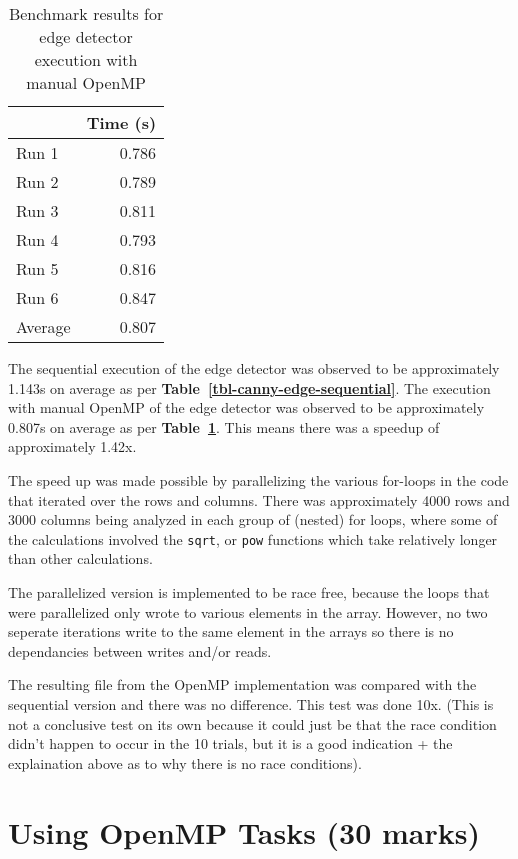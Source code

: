 \documentclass[12pt]{article}
\begin{document}
\begin{table}[H]
  \centering
  \begin{tabular}{lr}
    & {\bf Time (s)} \\
    \hline
    Run 1 & 0.786 \\
    Run 2 & 0.789 \\
    Run 3 & 0.811 \\
    Run 4 & 0.793 \\
    Run 5 & 0.816 \\
    Run 6 & 0.847 \\
    \hline
    Average & 0.807 \\
  \end{tabular}
  \caption{Benchmark results for edge detector execution with manual OpenMP}
  \label{tbl-canny-edge-openmp}
\end{table}

The sequential execution of the edge detector was observed to be approximately 1.143s on average as per {\bf Table~\ref{tbl-canny-edge-sequential}}. The execution with manual OpenMP of the edge detector was observed to be approximately 0.807s on average as per {\bf Table~\ref{tbl-canny-edge-openmp}}. This means there was a speedup of approximately 1.42x.

The speed up was made possible by parallelizing the various for-loops in the code that iterated over the rows and columns. There was approximately 4000 rows and 3000 columns being analyzed in each group of (nested) for loops, where some of the calculations involved the {\tt sqrt}, or {\tt pow} functions which take relatively longer than other calculations.

The parallelized version is implemented to be race free, because the loops that were parallelized only wrote to various elements in the array. However, no two seperate iterations write to the same element in the arrays so there is no dependancies between writes and/or reads.

The resulting file from the OpenMP implementation was compared with the sequential version and there was no difference. This test was done 10x. (This is not a conclusive test on its own because it could just be that the race condition didn't happen to occur in the 10 trials, but it is a good indication + the explaination above as to why there is no race conditions).

\section*{Using OpenMP Tasks (30 marks)}
\end{document}
